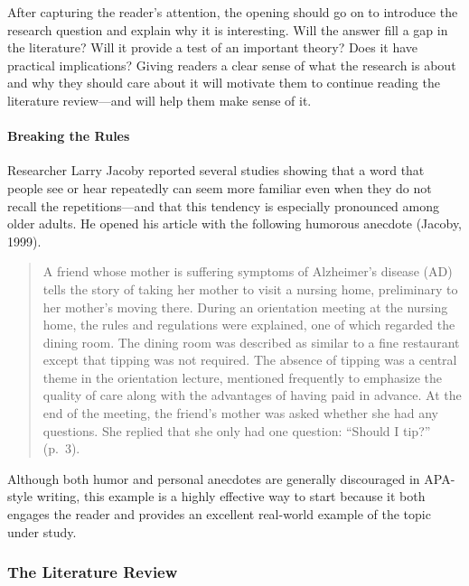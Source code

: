 \documentclass[
]{krantz}
\begin{document}
After capturing the reader's attention, the opening should go on to introduce the research question and explain why it is interesting. Will the answer fill a gap in the literature? Will it provide a test of an important theory? Does it have practical implications? Giving readers a clear sense of what the research is about and why they should care about it will motivate them to continue reading the literature review---and will help them make sense of it.

\paragraph*{Breaking the Rules}\label{breaking-the-rules}

Researcher Larry Jacoby reported several studies showing that a word that people see or hear repeatedly can seem more familiar even when they do not recall the repetitions---and that this tendency is especially pronounced among older adults. He opened his article with the following humorous anecdote (Jacoby, 1999).

\begin{quote}
A friend whose mother is suffering symptoms of Alzheimer's disease (AD) tells the story of taking her mother to visit a nursing home, preliminary to her mother's moving there. During an orientation meeting at the nursing home, the rules and regulations were explained, one of which regarded the dining room. The dining room was described as similar to a fine restaurant except that tipping was not required. The absence of tipping was a central theme in the orientation lecture, mentioned frequently to emphasize the quality of care along with the advantages of having paid in advance. At the end of the meeting, the friend's mother was asked whether she had any questions. She replied that she only had one question: ``Should I tip?'' (p.~3).
\end{quote}

Although both humor and personal anecdotes are generally discouraged in APA-style writing, this example is a highly effective way to start because it both engages the reader and provides an excellent real-world example of the topic under study.

\subsubsection*{The Literature Review}\label{the-literature-review}
\end{document}
